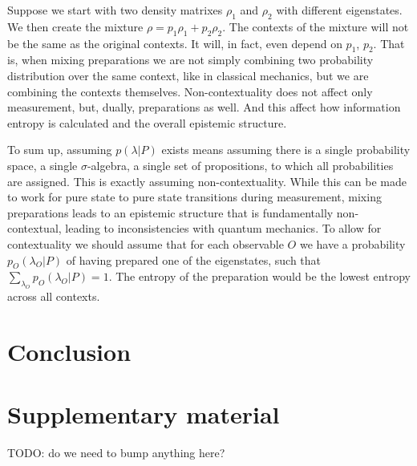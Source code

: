 \documentclass[10pt,twocolumn, nofootinbib]{revtex4-2}
\begin{document}
Suppose we start with two density matrixes $\rho_1$ and $\rho_2$ with different eigenstates. We then create the mixture $\rho = p_1 \rho_1 + p_2 \rho_2$. The contexts of the mixture will not be the same as the original contexts. It will, in fact, even depend on $p_1$, $p_2$. That is, when mixing preparations we are not simply combining two probability distribution over the same context, like in classical mechanics, but we are combining the contexts themselves. Non-contextuality does not affect only measurement, but, dually, preparations as well. And this affect how information entropy is calculated and the overall epistemic structure.


To sum up, assuming $p(\lambda|P)$ exists means assuming there is a single probability space, a single $\sigma$-algebra, a single set of propositions, to which all probabilities are assigned. This is exactly assuming non-contextuality. While this can be made to work for pure state to pure state transitions during measurement, mixing preparations leads to an epistemic structure that is fundamentally non-contextual, leading to inconsistencies with quantum mechanics. To allow for contextuality we should assume that for each observable $O$ we have a probability $p_O(\lambda_O|P)$ of having prepared one of the eigenstates, such that $\sum_{\lambda_O} p_O(\lambda_O|P) = 1$. The entropy of the preparation would be the lowest entropy across all contexts.



\section{Conclusion}

\section*{Supplementary material}

TODO: do we need to bump anything here?



\end{document}
